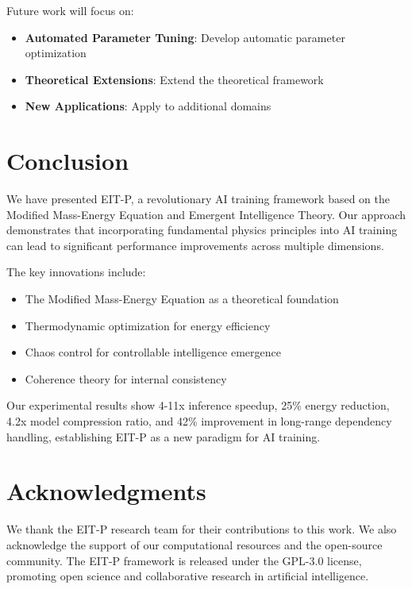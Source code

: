 \documentclass[12pt]{article}
\begin{document}
Future work will focus on:

\begin{itemize}
\item \textbf{Automated Parameter Tuning}: Develop automatic parameter optimization
\item \textbf{Theoretical Extensions}: Extend the theoretical framework
\item \textbf{New Applications}: Apply to additional domains
\end{itemize}

\section{Conclusion}

We have presented EIT-P, a revolutionary AI training framework based on the Modified Mass-Energy Equation and Emergent Intelligence Theory. Our approach demonstrates that incorporating fundamental physics principles into AI training can lead to significant performance improvements across multiple dimensions.

The key innovations include:
\begin{itemize}
\item The Modified Mass-Energy Equation as a theoretical foundation
\item Thermodynamic optimization for energy efficiency
\item Chaos control for controllable intelligence emergence
\item Coherence theory for internal consistency
\end{itemize}

Our experimental results show 4-11x inference speedup, 25\% energy reduction, 4.2x model compression ratio, and 42\% improvement in long-range dependency handling, establishing EIT-P as a new paradigm for AI training.

\section*{Acknowledgments}

We thank the EIT-P research team for their contributions to this work. We also acknowledge the support of our computational resources and the open-source community. The EIT-P framework is released under the GPL-3.0 license, promoting open science and collaborative research in artificial intelligence.



\end{document}
